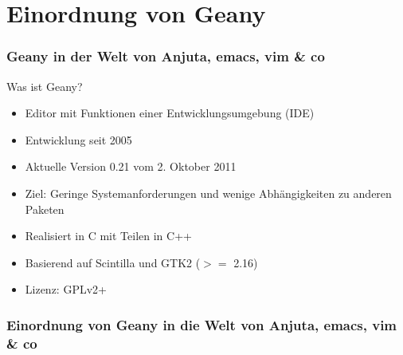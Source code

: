 \section[Einordnung]{Einordnung von Geany}
\begin{frame}
	\frametitle{Geany in der Welt von Anjuta, emacs, vim \& co}
	\begin{block}{Was ist Geany?}
		\begin{itemize}
			\item Editor mit Funktionen einer Entwicklungsumgebung (IDE)
			\item Entwicklung seit 2005
			\item Aktuelle Version 0.21 vom 2. Oktober 2011
			\item Ziel: Geringe Systemanforderungen und wenige
				  Abhängigkeiten zu anderen Paketen
			\item Realisiert in C mit Teilen in C++
			\item Basierend auf Scintilla und GTK2 ($>=$ 2.16)
			\item Lizenz: GPLv2+
		\end{itemize}
	\end{block}
\end{frame}

\begin{frame}
	\frametitle{Einordnung von Geany in die Welt von Anjuta, emacs, vim \& co}
	\begin{figure}[ht]
		\centering
 		\footnotesize
		
	\end{figure}
\end{frame}
